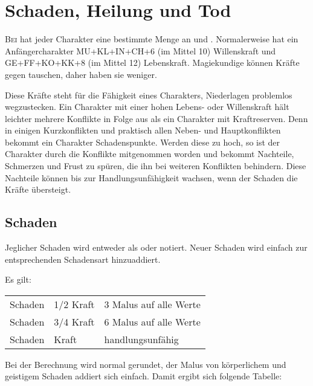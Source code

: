 \chapter{Schaden, Heilung und Tod}\label{Ch:SchadenHeilungUndTod}\label{VerletzungUndTod}


\lettrine{B}{ei} \StoryDSA hat jeder Charakter eine bestimmte Menge an  und . Normalerweise hat ein Anfängercharakter MU+KL+IN+CH+6 (im Mittel 10) Willenskraft und GE+FF+KO+KK+8 (im Mittel 12) Lebenskraft. Magiekundige können Kräfte gegen  tauschen, daher haben sie weniger.

Diese Kräfte steht für die Fähigkeit eines Charakters, Niederlagen problemlos wegzustecken. Ein Charakter mit einer hohen Lebens- oder Willenskraft hält leichter mehrere Konflikte in Folge aus als ein Charakter mit Kraftreserven. Denn in einigen Kurzkonflikten und praktisch allen Neben- und Hauptkonflikten bekommt ein Charakter Schadenspunkte. Werden diese zu hoch, so ist der Charakter durch die Konflikte mitgenommen worden und bekommt Nachteile, Schmerzen und Frust zu spüren, die ihn bei weiteren Konflikten behindern. Diese Nachteile können bis zur Handlungsunfähigkeit wachsen, wenn der Schaden die Kräfte übersteigt.

\section{Schaden}

Jeglicher Schaden wird entweder als  oder  notiert. Neuer Schaden wird einfach zur entsprechenden Schadensart hinzuaddiert.

Es gilt:
\begin{tabular}[C]{|r@{ $\ge$ }l|l|}
	\hline
	Schaden & 1/2 Kraft & 3 Malus auf alle Werte \\
	Schaden & 3/4 Kraft & 6 Malus auf alle Werte \\
	Schaden & Kraft & handlungsunfähig \\
	\hline
\end{tabular}
Bei der Berechnung wird normal gerundet, der Malus von körperlichem und geistigem Schaden addiert sich einfach. Damit ergibt sich folgende Tabelle:

